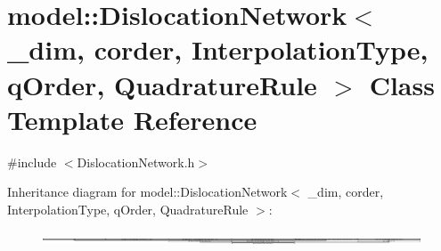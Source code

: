 \hypertarget{classmodel_1_1_dislocation_network}{}\section{model\+:\+:Dislocation\+Network$<$ \+\_\+dim, corder, Interpolation\+Type, q\+Order, Quadrature\+Rule $>$ Class Template Reference}
\label{classmodel_1_1_dislocation_network}


{\ttfamily \#include $<$Dislocation\+Network.\+h$>$}

Inheritance diagram for model\+:\+:Dislocation\+Network$<$ \+\_\+dim, corder, Interpolation\+Type, q\+Order, Quadrature\+Rule $>$\+:\begin{figure}[H]
\begin{center}
\leavevmode
\includegraphics[height=0.184089cm]{classmodel_1_1_dislocation_network}
\end{center}
\end{figure}
